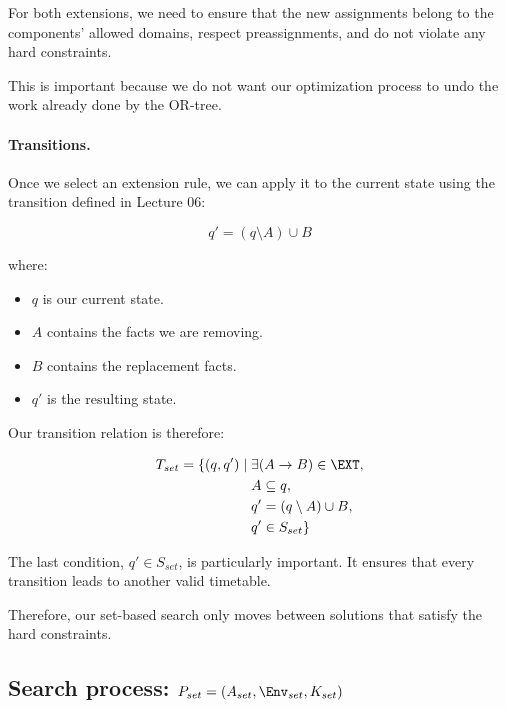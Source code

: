 For both extensions, we need to ensure that the new assignments belong to the components' allowed domains, respect preassignments, and do not violate any hard constraints.

This is important because we do not want our optimization process to undo the work already done by the OR-tree.

\paragraph{Transitions.}

Once we select an extension rule, we can apply it to the current state using the transition defined in Lecture 06:

\begin{equation}
    q'=(q\setminus A)\cup B
\end{equation}

where:
\begin{itemize}
    \item $q$ is our current state.
    \item $A$ contains the facts we are removing.
    \item $B$ contains the replacement facts.
    \item $q'$ is the resulting state.
\end{itemize}

Our transition relation is therefore:

\begin{equation}
    \begin{aligned}
    T_{set}=\{(q,q')\mid\;&
    \exists(A\rightarrow B)\in\EXT,\\
    &A\subseteq q,\\
    &q'=(q\setminus A)\cup B,\\
    &q'\in S_{set}\}
    \end{aligned}
\end{equation}

The last condition, $q'\in S_{set}$, is particularly important. It ensures that every transition leads to another valid timetable.

Therefore, our set-based search only moves between solutions that satisfy the hard constraints.

\subsection{Search process: $P_{set}=(A_{set},\Env_{set},K_{set})$}

